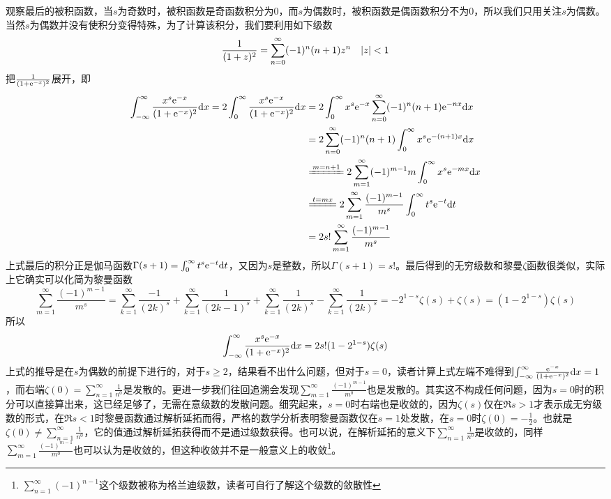 \documentclass[../../main.tex]{subfiles}
\begin{document}
\begin{example}
\begin{solution}
        观察最后的被积函数，当\(s\)为奇数时，被积函数是奇函数积分为0，而\(s\)为偶数时，被积函数是偶函数积分不为0，所以我们只用关注\(s\)为偶数。当然\(s\)为偶数并没有使积分变得特殊，为了计算该积分，我们要利用如下级数
        \begin{equation}
            \frac{1}{(1+z)^2}=\sum_{n=0}^{\infty}(-1)^n(n+1)z^n\quad \abs{z}<1
        \end{equation}
        把\(\frac{1}{(1+\mathrm{e}^{-x})^2}\)展开，即
        \begin{equation}
            \begin{split}
                \int_{-\infty}^{\infty}\frac{x^s\e^{-x}}{(1+\e^{-x})^2}\dd x=2\int_{0}^{\infty}\frac{x^s\e^{-x}}{(1+\e^{-x})^2}\dd x&=2\int_0^{\infty}x^s\e^{-x}\sum_{n=0}^{\infty}(-1)^n(n+1)\e^{-nx}\dd x \\
                &=2\sum_{n=0}^{\infty}(-1)^n(n+1)\int_0^{\infty}x^s\e^{-(n+1)x}\dd x \\
                & \xlongequal{m=n+1}2\sum_{m=1}^{\infty}(-1)^{m-1}m\int_0^{\infty}x^s\e^{-mx}\dd x \\
                & \xlongequal{t=mx}2\sum_{m=1}^{\infty}\frac{(-1)^{m-1}}{m^s}\int_0^{\infty}t^s\e^{-t}\dd t \\
                &=2s!\sum_{m=1}^{\infty}\frac{(-1)^{m-1}}{m^s}
            \end{split}
        \end{equation}
        上式最后的积分正是伽马函数\(\Gamma(s+1)=\int_0^{\infty}t^s\mathrm{e}^{-t}\dd t\)，又因为\(s\)是整数，所以\(\Gamma(s+1)=s!\)。最后得到的无穷级数和黎曼\(\zeta\)函数很类似，实际上它确实可以化简为黎曼函数
        \begin{equation}
            \sum_{m=1}^{\infty}\frac{(-1)^{m-1}}{m^s}=\sum_{k=1}^{\infty}\frac{-1}{(2k)^s}+\sum_{k=1}^{\infty}\frac{1}{(2k-1)^s}+\sum_{k=1}^{\infty}\frac{1}{(2k)^s}-\sum_{k=1}^{\infty}\frac{1}{(2k)^s}=-2^{1-s}\zeta(s)+\zeta(s)=(1-2^{1-s})\zeta(s)
        \end{equation}
        所以
        \begin{equation}
            \int_{-\infty}^{\infty}\frac{x^s\mathrm{e}^{-x}}{(1+\mathrm{e}^{-x})^2}\dd x=2s!(1-2^{1-s})\zeta(s)
        \end{equation}
        上式的推导是在\(s\)为偶数的前提下进行的，对于\(s\geq2\)，结果看不出什么问题，但对于\(s=0\)，读者计算上式左端不难得到\(\int_{-\infty}^{\infty}\frac{\mathrm{e}^{-x}}{(1+\mathrm{e}^{-x})^2}\dd x=1\)，而右端\(\zeta(0)=\sum_{n=1}^{\infty}\frac{1}{n^0}\)是发散的。更进一步我们往回追溯会发现\(\sum_{m=1}^{\infty}\frac{(-1)^{m-1}}{m^0}\)也是发散的。其实这不构成任何问题，因为\(s=0\)时的积分可以直接算出来，这已经足够了，无需在意级数的发散问题。细究起来，\(s=0\)时右端也是收敛的，因为\(\zeta(s)\)仅在\(\Re{s}>1\)才表示成无穷级数的形式，在\(\Re{s}<1\)时黎曼函数通过解析延拓而得，严格的数学分析表明黎曼函数仅在\(s=1\)处发散，在\(s=0\)时\(\zeta(0)=-\frac{1}{2}\)。也就是\(\zeta(0)\neq\sum_{n=1}^{\infty}\frac{1}{n^0}\)，它的值通过解析延拓获得而不是通过级数获得。也可以说，在解析延拓的意义下\(\sum_{n=1}^{\infty}\frac{1}{n^0}\)是收敛的，同样\(\sum_{m=1}^{\infty}\frac{(-1)^{m-1}}{m^0}\)也可以认为是收敛的，但这种收敛并不是一般意义上的收敛\footnote{\(\sum_{n=1}^{\infty}{(-1)^{n-1}}\)这个级数被称为格兰迪级数，读者可自行了解这个级数的敛散性}。


\end{solution}
\end{example}
\end{document}

